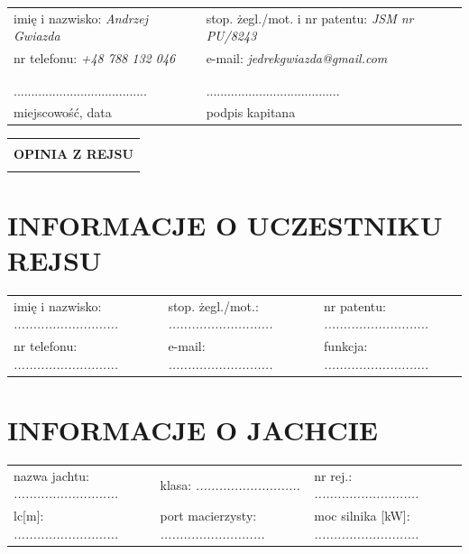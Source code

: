 \documentclass{article}
\begin{document}
\begin{tabularx}{\textwidth}{X X}
imię i nazwisko: \textit{Andrzej Gwiazda} & stop. żegl./mot. i nr patentu: \textit{JSM nr PU/8243}\\
nr telefonu: \textit{+48 788 132 046} & e-mail: \textit{jedrekgwiazda@gmail.com}\\
\\\\
...................................... & ......................................\\
miejscowość, data & podpis kapitana\\
\end{tabularx}
\newpage
\begin{tabularx}{\textwidth} { 
  | >{\centering\arraybackslash}X | }
 \hline
 \\
 \textbf{\huge OPINIA Z REJSU} \\
 \\
\hline
\end{tabularx}

\section*{INFORMACJE O UCZESTNIKU REJSU}
\begin{tabularx}{\textwidth}{X X X}
imię i nazwisko: \textit{...........................} & stop. żegl./mot.: \textit{...........................} & nr patentu: \textit{...........................} \\
nr telefonu: \textit{...........................} & e-mail: \textit{...........................} & funkcja: \textit{...........................} \\
\end{tabularx}

\section*{INFORMACJE O JACHCIE}

\begin{tabularx}{\textwidth}{X X X}
nazwa jachtu: \textit{...........................} & klasa: \textit{...........................} & nr rej.: \textit{...........................} \\
lc[m]: \textit{...........................} & port macierzysty: \textit{...........................} & moc silnika [kW]: \textit{...........................} \\
\end{tabularx}
\end{document}
